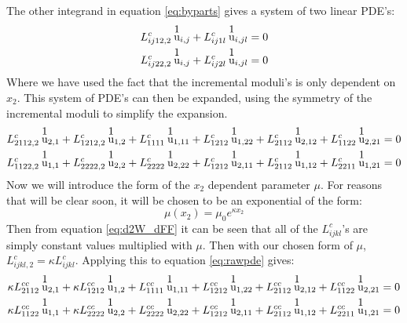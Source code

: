 \documentclass[11pt]{article}
\begin{document}
The other integrand in equation \ref{eq:byparts} gives a system of two linear PDE's:
\begin{equation}
\begin{aligned}
L^c_{ij12,2} \: \stackon{u}{1}_{i,j} + L^c_{ij1l} \: \stackon{u}{1}_{i,jl} &= 0 \\
L^c_{ij22,2} \: \stackon{u}{1}_{i,j} + L^c_{ij2l} \: \stackon{u}{1}_{i,jl} &= 0  
\end{aligned}
\end{equation}
Where we have used the fact that the incremental moduli's is only dependent on $x_2$. This system of PDE's can then be expanded, using the symmetry of the incremental moduli to simplify the expansion. 
\begin{equation} \label{eq:rawpde}
\begin{aligned}
L^c_{2112,2} \: \stackon{u}{1}_{2,1} + L^c_{1212,2} \: \stackon{u}{1}_{1,2} + L^c_{1111} \: \stackon{u}{1}_{1,11} + L^c_{1212} \: \stackon{u}{1}_{1,22}+ L^c_{2112} \: \stackon{u}{1}_{2,12}  + L^c_{1122} \: \stackon{u}{1}_{2,21} &= 0 \\
L^c_{1122,2} \: \stackon{u}{1}_{1,1} + L^c_{2222,2} \: \stackon{u}{1}_{2,2} + L^c_{2222} \: \stackon{u}{1}_{2,22}+ L^c_{1212} \: \stackon{u}{1}_{2,11}+ L^c_{2112} \: \stackon{u}{1}_{1,12}  + L^c_{2211} \: \stackon{u}{1}_{1,21} &= 0
\end{aligned}
\end{equation}
Now we will introduce the form of the $x_2$ dependent parameter $\mu$. For reasons that will be clear soon, it will be chosen to be an exponential of the form:
\begin{equation}
\mu(x_2) = \mu_0 e^{\kappa x_2}
\end{equation}
Then from equation \ref{eq:d2W_dFF} it can be seen that all of the $L^c_{ijkl}$'s are simply constant values multiplied with $\mu$. Then with our chosen form of $\mu$, $L^c_{ijkl,2} = \kappa L^c_{ijkl}$. Applying this to equation \ref{eq:rawpde} gives:
\begin{equation} \label{eq:pde}
\begin{aligned}
\kappa L^{cc}_{2112} \: \stackon{u}{1}_{2,1} + \kappa L^{cc}_{1212} \: \stackon{u}{1}_{1,2} + L^{cc}_{1111} \: \stackon{u}{1}_{1,11} + L^{cc}_{1212} \: \stackon{u}{1}_{1,22}+ L^{cc}_{2112} \: \stackon{u}{1}_{2,12}  + L^{cc}_{1122} \: \stackon{u}{1}_{2,21} &= 0 \\
\kappa L^{cc}_{1122} \: \stackon{u}{1}_{1,1} + \kappa L^{cc}_{2222} \: \stackon{u}{1}_{2,2} + L^{cc}_{2222} \: \stackon{u}{1}_{2,22}+ L^{cc}_{1212} \: \stackon{u}{1}_{2,11}+ L^{cc}_{2112} \: \stackon{u}{1}_{1,12}  + L^{cc}_{2211} \: \stackon{u}{1}_{1,21} &= 0
\end{aligned}
\end{equation}
\end{document}
